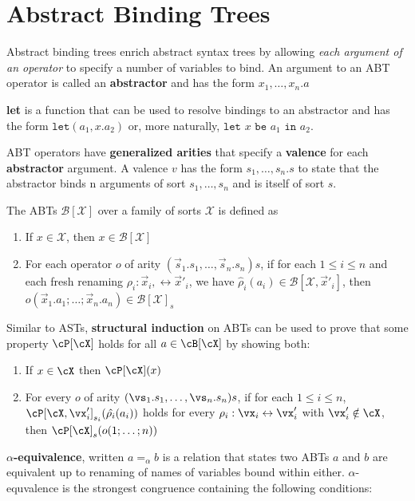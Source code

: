 \documentclass[11pt]{book}
\begin{document}
\section{Abstract Binding Trees}
Abstract binding trees enrich abstract syntax trees by allowing \textit{each argument of an operator} to specify a number of variables to bind. An argument to an ABT operator is called an \textbf{abstractor} and has the form $x_1,\dots,x_n.a$

\textbf{let} is a function that can be used to resolve bindings to an abstractor and has the form $\texttt{let}(a_1,x.a_2)$ or, more naturally, $\texttt{let}$ $x$ $\texttt{be}$ $a_1$ $\texttt{in}$ $a_2$.

ABT operators have \textbf{generalized arities} that specify a \textbf{valence} for each \textbf{abstractor} argument. A valence $v$ has the form $s_1,\dots,s_n.s$ to state that the abstractor binds n arguments of sort $s_1,\dots,s_n$ and is itself of sort $s$.

\br

The ABTs $\mathcal{B[X]}$ over a family of sorts $\mathcal{X}$ is defined as
\begin{enumerate}
    \item If $x \in \mathcal{X}$, then $x \in \mathcal{B[X]}$
    \item For each operator $o$ of arity $(\vec{s}_1.s_1,\dots,\vec{s}_n.s_n)s$, if for each $1 \leq i \leq n$  and each fresh renaming $\rho_i: \vec{x}_i, \leftrightarrow \vec{x}'_i$, we have $\hat{\rho}_i(a_i) \in \mathcal{B}[\mathcal{X},\vec{x}'_i]$, then $o(\vec{x}_1.a_1;\dots;\vec{x}_n.a_n) \in \mathcal{B[X]}_s$
\end{enumerate}

\br

Similar to ASTs, \textbf{structural induction} on ABTs can be used to prove that some property $\cP[\cX]$ holds for all $a \in {\cB[\cX]}$ by showing both:
\begin{enumerate}
    \item If $x \in \cX$ then $\cP[\cX](x)$
    \item For every $o$ of arity $\arityb$, if for each $1 \leq i \leq n$, $\cP[\cX,\vx'_i]_{s_i}(\hat{\rho_i}(a_i))$ holds for every $\rho_i: \vx_i \biject \vx'_i$ with $\vx'_i \notin \cX$, then $\cP[\cX]_s(\abtOperatorInstance)$
\end{enumerate}

\br

\textbf{$\alpha$-equivalence}, written $a =_\alpha b$ is a relation that states two ABTs $a$ and $b$ are equivalent up to renaming of names of variables bound within either. $\alpha$-equvalence is the strongest congruence containing the following conditions:
\end{document}
